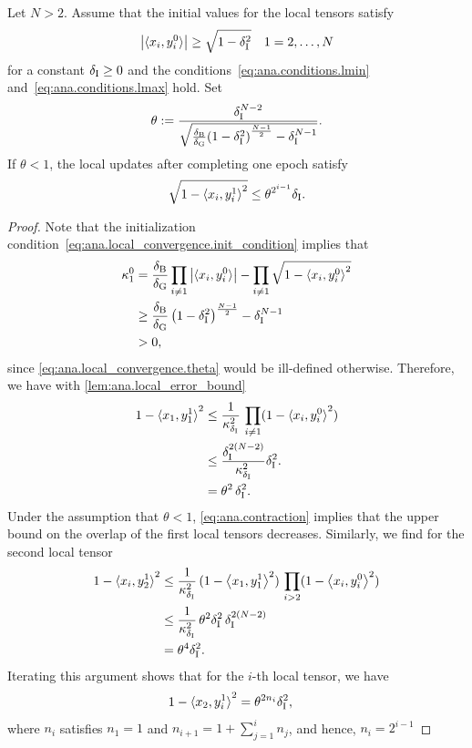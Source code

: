 \begin{theorem}%
  \label{thm:ana.local_convergence}
  Let $N > 2$.
  Assume that the initial values for the local tensors satisfy
  \[
    \label{eq:ana.local_convergence.init_condition}
    {\left\vert\braket{x_i, y_i^0}\right\vert} \ge \sqrt{1 - \delta_\mathrm{I}^2} \quad 1 = 2, \ldots, N
  \]
  for a constant $\delta_\mathrm{I} \ge 0$ and the conditions~\eqref{eq:ana.conditions.lmin} and~\eqref{eq:ana.conditions.lmax} hold.
  Set
  \[
    \label{eq:ana.local_convergence.theta}
    \theta := \frac{\delta_\mathrm{I}^{N - 2}}{\sqrt{\frac{\delta_\mathrm{B}}{\delta_\mathrm{G}}{(1 - \delta_\mathrm{I}^2)}^{\frac{N - 1}{2}} - \delta_\mathrm{I}^{N - 1}}}.
  \]
  If $\theta < 1$, the local updates after completing one epoch satisfy
  \[
    \sqrt{1 - \braket{x_i, y_i^1}^2} \le \theta^{2^{i - 1}} \delta_\mathrm{I}.
    \label{eq:ana.local_convergence.bound}
  \]
\end{theorem}
\begin{proof}
  Note that the initialization condition~\eqref{eq:ana.local_convergence.init_condition} implies that
  \begin{align}
    \kappa_1^0
    &= \frac{\delta_\mathrm{B}}{\delta_\mathrm{G}} \prod_{i \neq 1} {\left\vert\braket{x_i, y_i^0}\right\vert} - \prod_{i \neq 1} \sqrt{1 - {\braket{x_i, y_i^0}}^2} \\
    &\ge \frac{\delta_\mathrm{B}}{\delta_\mathrm{G}} \left( 1 - \delta_\mathrm{I}^2 \right)^{\frac{N - 1}{2}} - \delta_\mathrm{I}^{N-1} \\
    &> 0,
  \end{align}
  since \cref{eq:ana.local_convergence.theta} would be ill-defined otherwise.
  Therefore, we have with \cref{lem:ana.local_error_bound}
  \begin{align}
    1 - \braket{x_1, y_1^1}^2
    &\le \frac{1}{\kappa_{\delta_\mathrm{I}}^2} \, \prod_{i \neq 1} (1 - \braket{x_i, y_i^0}^2)  \\
    &\le \frac{\delta_\mathrm{I}^{2(N - 2)}}{\kappa_{\delta_\mathrm{I}}^2} \delta_\mathrm{I}^2. \\
    &= \theta^2 \, \delta_\mathrm{I}^2.
    \label{eq:ana.contraction}
  \end{align}
  Under the assumption that $\theta < 1$, \cref{eq:ana.contraction} implies that the upper bound on the overlap of the first local tensors decreases.
  Similarly, we find for the second local tensor
  \begin{align}
    1 - \braket{x_i, y_2^1}^2
    &\le \frac{1}{\kappa_{\delta_\mathrm{I}}^2} \, (1 - \Braket{x_1, y_1^1}^2) \, \prod_{i > 2} (1 - \Braket{x_i, y_i^0}^2) \\
    &\le \frac{1}{\kappa_{\delta_\mathrm{I}}^2} \, \theta^2 \delta_\mathrm{I}^2 \, \delta_\mathrm{I}^{2(N - 2)} \\
    &= \theta^4 \delta_\mathrm{I}^2.
  \end{align}
  Iterating this argument shows that for the $i$-th local tensor, we have
  \begin{align}
    1 - \braket{x_2, y_i^1}^2 &= \theta^{2 n_i} \delta_\mathrm{I}^2,
  \end{align}
  where $n_i$ satisfies $n_1 = 1$ and $n_{i + 1} = 1 + \sum_{j=1}^i n_j$, and hence, $n_i = 2^{i - 1}$
\end{proof}

